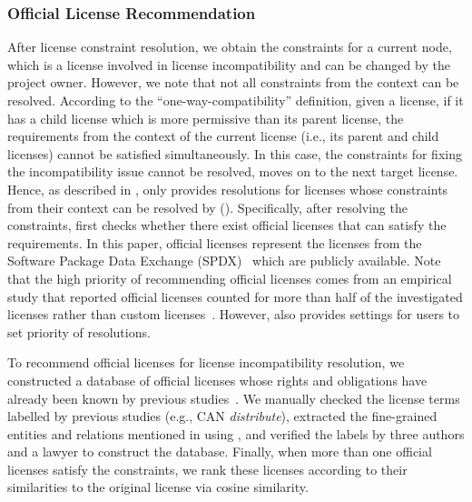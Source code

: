 \subsubsection{{Official License Recommendation}} \label{sec:official}

After license constraint resolution, we obtain the constraints for a current node, which is a license involved in license incompatibility and can be changed by the project owner. However, we note that not all constraints from the context can be resolved. According to the ``one-way-compatibility'' definition, given a license, if it has a child license which is more permissive than its parent license, the requirements from the context of the current license (i.e., its parent and child licenses) cannot be satisfied simultaneously. In this case, the constraints for fixing the incompatibility issue cannot be resolved, \tool moves on to the next target license. Hence, as described in , \tool only provides resolutions for licenses whose constraints from their context can be resolved by \tool (). Specifically, after resolving the constraints, \tool first checks whether there exist official licenses that can satisfy the requirements. In this paper, official licenses represent the licenses from the Software Package Data Exchange (SPDX)~\cite{spdx} which are publicly available. Note that the high priority of recommending official licenses comes from an empirical study that reported official licenses counted for more than half of the investigated licenses rather than custom licenses~\cite{xu2021lidetector}. However, \tool also provides settings for users to set priority of resolutions.

To recommend official licenses for license incompatibility resolution, we constructed a database of official licenses whose rights and obligations have already been known by previous studies~\cite{tldrlegal,xu2021lidetector}. We manually checked the license terms labelled by previous studies (e.g., CAN \textit{distribute}), extracted the fine-grained entities and relations mentioned in  using \tool, and verified the labels by three authors and a lawyer to construct the database. Finally, when more than one official licenses satisfy the constraints, we rank these licenses according to their similarities to the original license via cosine similarity. %

